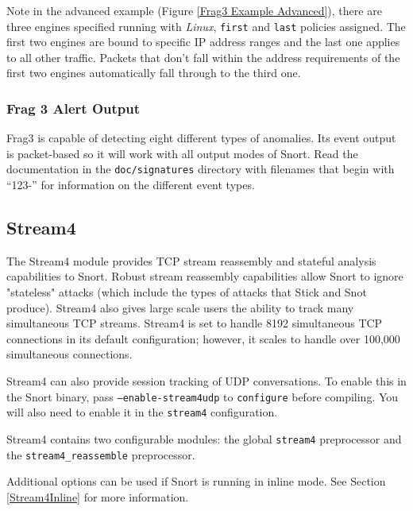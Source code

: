 \documentclass[english]{report}
\newenvironment{note}{
\samepage
    \vspace{10pt}{\textsf{
        {\hspace{7pt}\Huge{$\triangle$\hspace{-12.5pt}{\Large{$^!$}}}}\hspace{5pt}
        {\Large{NOTE}}
    }
    }
   \begin{center}
    \par\vspace{-17pt}

    \begin{lrbox}{\savepar}
    \begin{minipage}[r]{6in}
}
{
    \end{minipage}
    \end{lrbox}
    \fbox{
        \usebox{
            \savepar
	}
    }
    \par\vskip10pt
    \end{center}
}
\begin{document}
Note in the advanced example (Figure \ref{Frag3 Example Advanced}), there are three engines specified running with 
\emph{Linux}, \texttt{first} and \texttt{last} policies assigned.  The first two engines are bound to
specific IP address ranges and the last one applies to all other traffic.
Packets that don't fall within the address requirements of the first two engines
automatically fall through to the third one.

\subsubsection{Frag 3 Alert Output\label{frag3 alert output}}

Frag3 is capable of detecting eight different types of anomalies.  Its event
output is packet-based so it will work with all output modes of Snort.  Read
the documentation in the \texttt{doc/signatures} directory with filenames that begin
with ``123-'' for information on the different event types.



\subsection{Stream4\label{stream 4 section}}

The Stream4 module provides TCP stream reassembly and stateful analysis
capabilities to Snort. Robust stream reassembly capabilities allow Snort
to ignore "stateless" attacks (which include the types of attacks that
Stick and Snot produce). Stream4 also gives large scale users the ability
to track many simultaneous TCP streams.  Stream4 is set to handle 8192
simultaneous TCP connections in its default configuration; however, it
scales to handle over 100,000 simultaneous connections.

Stream4 can also provide session tracking of UDP conversations. To enable
this in the Snort binary, pass \texttt{--enable-stream4udp} to
\texttt{configure} before compiling.  You will also need to enable it
in the \texttt{stream4} configuration.

Stream4 contains two configurable modules: the global \texttt{stream4} preprocessor
and the \texttt{stream4\_reassemble} preprocessor. 

\begin{note}
Additional options can be used if Snort is running in inline mode. See Section \ref{Stream4Inline} for more information.
\end{note}
\end{document}
